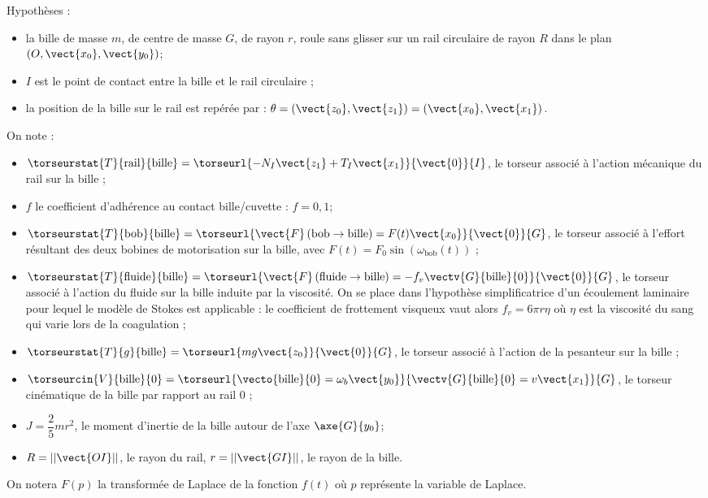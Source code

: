 Hypothèses :
\begin{itemize}
\item la bille de masse $m$, de centre de masse $G$, de rayon $r$,
roule sans glisser sur un rail circulaire de rayon $R$ dans
le plan $\left(O,\vect{x_0},\vect{y_0}\right)$;
\item $I$ est le point de contact entre la bille et le rail circulaire ;
\item la position de la bille sur le rail est repérée par : $\theta = \left(\vect{z_0},\vect{z_1} \right)= \left(\vect{x_0},\vect{x_1} \right)$.
\end{itemize}

On note :
\begin{itemize}
\item $\torseurstat{T}{\text{rail}}{\text{bille}} = \torseurl{-N_I\vect{z_1}+T_I\vect{x_1}}{\vect{0}}{I}$, le torseur associé à l’action mécanique du rail sur la bille ;
\item $f$ le coefficient d’adhérence au contact bille/cuvette : $f=0,1$; 
\item $\torseurstat{T}{\text{bob}}{\text{bille}} = \torseurl{\vect{F}\left(\text{bob} \rightarrow \text{bille} \right)=F(t)\vect{x_0}}{\vect{0}}{G}$, le torseur associé à l’effort résultant des deux bobines de motorisation sur la bille, avec $F(t)=F_0\sin\left(\omega_{\text{bob}}(t)\right)$ ;
\item $\torseurstat{T}{\text{fluide}}{\text{bille}} = \torseurl{\vect{F}\left(\text{fluide} \rightarrow \text{bille} \right)=-f_v\vectv{G}{\text{bille}}{0}}{\vect{0}}{G}$, le torseur associé à
l’action du fluide sur la bille induite par la viscosité. On se place dans l’hypothèse
simplificatrice d’un écoulement laminaire pour lequel le modèle de Stokes est applicable : le
coefficient de frottement visqueux vaut alors $f_v = 6\pi r \eta $  où $\eta$ est la viscosité du sang qui
varie lors de la coagulation ;
\item $\torseurstat{T}{g}{\text{bille}} = \torseurl{mg\vect{z_0}}{\vect{0}}{G}$, le torseur associé à l’action de la pesanteur sur la bille ;
\item $\torseurcin{V}{\text{bille}}{0} = \torseurl{\vecto{\text{bille}}{0}=\omega_b \vect{y_0}}{\vectv{G}{\text{bille}}{0}=v\vect{x_1}}{G}$, le torseur cinématique de la bille par rapport au rail 0 ;
\item $J = \dfrac{2}{5}mr^2$, le moment d’inertie de la bille autour de l’axe $\axe{G}{y_0}$;
\item $R=||\vect{OI}||$, le rayon du rail, $r=||\vect{GI}||$, le rayon de la bille.
\end{itemize}
On notera $F(p)$ la transformée de Laplace de la fonction $f(t)$ où $p$ représente la variable de
Laplace.

